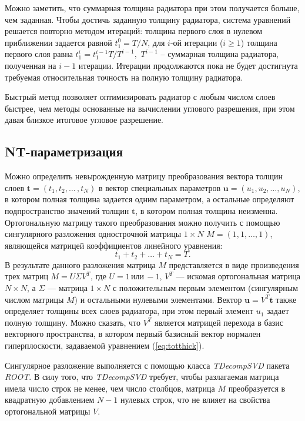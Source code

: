 \documentclass[12pt]{article}
\begin{document}
Можно заметить, что суммарная толщина радиатора при этом получается больше, чем заданная. Чтобы достичь заданную толщину радиатора, система уравнений решается повторно методом итераций: толщина первого слоя в нулевом приближении задается равной $t_1^0 = T/N$, 
для $i$-ой итерации ($i\geq 1$) толщина первого слоя равна $t_1^i=t_1^{i-1} T/T^{i-1},$ $T^{i-1}$ -- суммарная толщина радиатора, полученная на $i-1$ итерации. 
Итерации продолжаются пока не будет достигнута требуемая относительная точность на полную толщину радиатора.

Быстрый метод позволяет оптимизировать радиатор с любым числом слоев быстрее, чем методы основанные на вычислении углового разрешения, при этом давая близкое 
итоговое угловое разрешение.

\subsection{NT-параметризация}
\label{ss:ntpar}
Можно определить невырожденную матрицу преобразования вектора толщин слоев $\boldsymbol{t}=(t_1,t_2,\ldots\,,t_{N})$ в вектор 
специальных параметров $\boldsymbol{u}=(u_1,u_2,\ldots,u_{N})$, в котором полная толщина задается одним параметром, 
а остальные определяют подпространство значений толщин $\boldsymbol{t}$, в котором полная толщина неизменна. 
Ортогональную матрицу такого преобразования можно получить с помощью сингулярного 
разложения однострочной матрицы $1\times N$ $M=(1,1,\ldots,1)$, являющейся матрицей коэффициентов линейного уравнения:
\begin{equation}
t_1+t_2+\ldots+t_{N} = T.
\label{eq:totthick}
\end{equation}
В результате данного разложения матрица $M$ представляется в виде произведения трех матриц $M=U\Sigma V^T$, где $U=1\, \mathrm{или}\, -1$,
$V^T$ --- искомая ортогональная матрица $N\times N$, а $\Sigma$ --- матрица $1\times N$ с положительным первым элементом (сингулярным числом матрицы $M$) и остальными 
нулевыми элементами. Вектор $\boldsymbol{u} = V^T \boldsymbol{t}$ также определяет толщины всех слоев радиатора, при этом первый элемент $u_1$ задает полную толщину. 
Можно сказать, что $V^T$ является матрицей перехода в  базис векторного пространства, в котором первый базисный вектор нормален гиперплоскости, задаваемой уравнением (\ref{eq:totthick}).

Сингулярное разложение выполняется с помощью класса {\em TDecompSVD} пакета {\em ROOT}. В силу того, что {\em TDecompSVD} требует, чтобы разлагаемая матрица 
имела число строк не менее, чем число столбцов, матрица $M$ преобразуется в квадратную добавлением $N-1$ нулевых строк, что не влияет на свойства ортогональной матрицы $V$.
\end{document}
